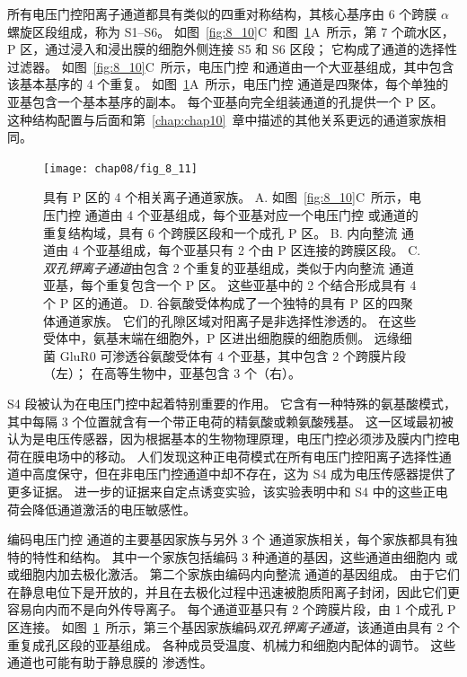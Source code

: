 所有电压门控阳离子通道都具有类似的四重对称结构，其核心基序由 6 个跨膜 $\alpha$ 螺旋区段组成，称为 S1–S6。
如图~\ref{fig:8_10}C~和图~\ref{fig:8_11}A~所示，第 7 个疏水区，P 区，通过浸入和浸出膜的细胞外侧连接 S5 和 S6 区段；
它构成了通道的选择性过滤器。
如图~\ref{fig:8_10}C~所示，电压门控  和通道由一个大亚基组成，其中包含该基本基序的 4 个重复。
如图~\ref{fig:8_11}A~所示，电压门控  通道是四聚体，每个单独的亚基包含一个基本基序的副本。
每个亚基向完全组装通道的孔提供一个 P 区。
这种结构配置与后面和第~\ref{chap:chap10}~章中描述的其他关系更远的通道家族相同。


\begin{figure}[htbp]
	\centering
	\texttt{[image: chap08/fig\_8\_11]}
	\caption{具有 P 区的 4 个相关离子通道家族。
		A. 如图~\ref{fig:8_10}C~所示，电压门控  通道由 4 个亚基组成，每个亚基对应一个电压门控  或通道的重复结构域，具有 6 个跨膜区段和一个成孔 P 区。
		B. 内向整流  通道由 4 个亚基组成，每个亚基只有 2 个由 P 区连接的跨膜区段。
		C. \textit{双孔钾离子通道}由包含 2 个重复的亚基组成，类似于内向整流  通道亚基，每个重复包含一个 P 区。
		这些亚基中的 2 个结合形成具有 4 个 P 区的通道。
		D. 谷氨酸受体构成了一个独特的具有 P 区的四聚体通道家族。
		它们的孔隙区域对阳离子是非选择性渗透的。
		在这些受体中，氨基末端在细胞外，P 区进出细胞膜的细胞质侧。
		远缘细菌 GluR0  可渗透谷氨酸受体有 4 个亚基，其中包含 2 个跨膜片段（左）；
		在高等生物中，亚基包含 3 个（右）。}
	\label{fig:8_11}
\end{figure}


S4 段被认为在电压门控中起着特别重要的作用。
它含有一种特殊的氨基酸模式，其中每隔 3 个位置就含有一个带正电荷的精氨酸或赖氨酸残基。
这一区域最初被认为是电压传感器，因为根据基本的生物物理原理，电压门控必须涉及膜内门控电荷在膜电场中的移动。
人们发现这种正电荷模式在所有电压门控阳离子选择性通道中高度保守，但在非电压门控通道中却不存在，这为 S4 成为电压传感器提供了更多证据。
进一步的证据来自定点诱变实验，该实验表明中和 S4 中的这些正电荷会降低通道激活的电压敏感性。


编码电压门控  通道的主要基因家族与另外 3 个  通道家族相关，每个家族都具有独特的特性和结构。
其中一个家族包括编码 3 种通道的基因，这些通道由细胞内  或或细胞内加去极化激活。
第二个家族由编码内向整流  通道的基因组成。
由于它们在静息电位下是开放的，并且在去极化过程中迅速被胞质阳离子封闭，因此它们更容易向内而不是向外传导离子。
每个通道亚基只有 2 个跨膜片段，由 1 个成孔 P 区连接。
如图~\ref{fig:8_11}~所示，第三个基因家族编码\textit{双孔钾离子通道}，该通道由具有 2 个重复成孔区段的亚基组成。
各种成员受温度、机械力和细胞内配体的调节。
这些通道也可能有助于静息膜的  渗透性。


